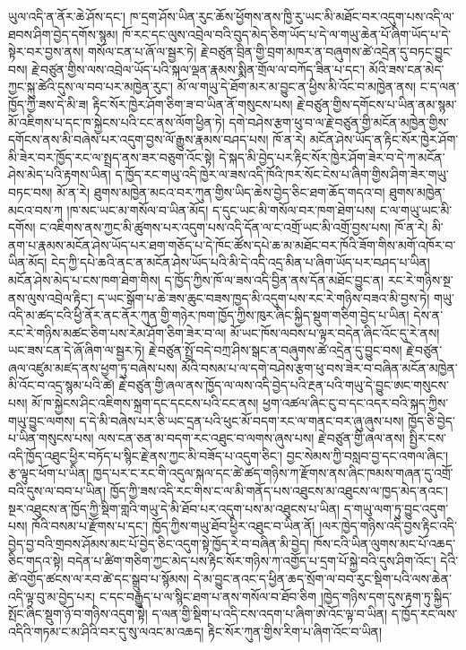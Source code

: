 \documentclass{article}
\begin{document}
ཡུལ་འདི་ན་ནོར་ཆེ་ཤོས་དང་། ཁ་དྲག་ཤོས་ཡིན་རུང་ཆོས་ཕྱོགས་ནས་ཁྱི་རུ་ཡང་མི་མཐོང་བར་འདུག་པས་འདི་ལ་ཐབས་ཤིག་བྱེད་དགོས་སྙམ། ཁོ་རང་དང་ལུས་འབྲེལ་བའི་བུད་མེད་ཅིག་ཡོད་པ་དེ་ལ་གཡུ་ཆེན་པོ་ཞིག་ཡོད་པ་དེ་སྟེར་བར་བྱས་ནས། གསོལ་ངན་པ་ཞོ་ལ་སྦྱར་ཏེ། རྗེ་བཙུན་བྲིན་གྱི་བྲག་མཁར་ན་བཞུགས་ཚེ་འདྲེན་དུ་བཏང་བྱུང་བས། རྗེ་བཙུན་གྱིས་ལས་འབྲེལ་ཡོད་པའི་སྐལ་ལྡན་རྣམས་སྨིན་གྲོལ་ལ་བཀོད་ཟིན་པ་དང་། མོའི་ཟས་ངན་མེད་ཀྱང་སྐུ་ཚེའི་དུས་ལ་བབ་པར་མཁྱེན་རུང་། མོ་ལ་གཡུ་དེ་ཐོག་མར་མ་བྱུང་ན་ཕྱིས་མི་འོང་བ་མཁྱེན་ནས། ང་ད་ལན་ཁྱོད་ཀྱི་ཟས་དེ་མི་ཟ། རྟིང་སོར་ཁྱེར་ཤོག་ཅིག་ཟ་བ་ཡིན་ནོ་གསུངས་པས། རྗེ་བཙུན་གྱིས་དགོངས་པ་ཡིན་ནམ་སྙམ་མོ་འཇིགས་པ་དང་ཁ་སྐྱེངས་པའི་ངང་ནས་ལོག་ཕྱིན་ཏེ། དགེ་བཤེས་རྩག་ཕུ་བ་ལ་རྗེ་བཙུན་གྱི་མངོན་མཁྱེན་གྱིས་དགོངས་ནས་མི་བཞེས་པར་འདུག་བྱས་ལོ་རྒྱུས་རྣམས་བཤད་པས། ཁོ་ན་རེ། མངོན་ཤེས་ཡོད་ན་རྟིང་སོར་ཁྱེར་ཤོག་མི་ཟེར་བར་ཁྱོད་རང་ལ་སྤྲད་ནས་ཟར་བཅུག་འོང་སྟེ། དེ་སྐད་མི་བྱེད་པར་རྟིང་སོར་ཁྱེར་ཤོག་ཟེར་བ་དེ་ཀ་མངོན་ཤེས་མེད་པའི་རྟགས་ཡིན། ད་ཁྱོད་རང་གཡུ་འདི་ཁྱེར་ལ་ཟས་འདི་ཁོའི་ཁར་སོང་ངེས་པ་ཞིག་གྱིས་ཤིག་ཟེར་གཡུ་བཏང་བས། མོ་ན་རེ། ཐུགས་མཁྱེན་མངའ་བར་ཀུན་གྱིས་ཡིད་ཆེས་བྱེད་ཅིང་ཐག་ཆོད་གདའ་བ། ཐུགས་མཁྱེན་མངའ་བས་ཀ །ཁ་སང་ཡང་མ་གསོལ་བ་ཡིན་མོད། ད་དུང་ཡང་མི་གསོལ་བར་ཁག་ཐེག་པས། ང་ལ་གཡུ་ཡང་མི་དགོས། ང་འཇིགས་ནས་ཀྱང་མི་ཚུགས་པར་འདུག་པས་འདི་དོན་ལ་ང་འགྲོ་ཡང་མི་འགྲོ་བྱས་པས། ཁོ་ན་རེ། མི་ནག་པ་རྣམས་མངོན་ཤེས་ཡོད་པར་ཐག་གཅོད་པ་དེ་ཁོང་ཚོས་དཔེ་ཆ་མ་མཐོང་བར་ཁོའི་ཟོག་གིས་མགོ་འཁོར་བ་ཡིན་མོད། ངེད་ཀྱི་དཔེ་ཆའི་ནང་ན་མངོན་ཤེས་ཡོད་པའི་མི་དེ་འདི་འདྲ་མིན་པ་ཞིག་ཡོད་པར་བཤད་པ་ཡིན། མངོན་ཤེས་མེད་པ་ངས་ཁག་ཐེག་གིས། ད་ཁྱོད་ཀྱིས་ཁོ་ལ་ཟས་འདི་བྱིན་ནས་དོན་མཐོང་བྱུང་ན། རང་རེ་གཉིས་སྔ་ནས་ལུས་འབྲེལ་རྟིང་། ད་ཡང་སྒོག་པ་ཆེ་ཟས་ཆུང་བཟས་ཁྱད་མི་འདུག་པས་རང་རེ་གཉིས་བཟའ་མི་བྱས་ཏེ། གཡུ་འདི་མ་ཚད་ངའི་ཕྱི་ནོར་ནང་ནོར་ཀུན་གྱི་གཉེར་ཁག་ཁྱོད་ཀྱིས་ཁུར་ཞིང་སྐྱིད་སྡུག་གཅིག་བྱེད་པ་ཡིན། དེས་ན་རང་རེ་གཉིས་མཚང་ཅིག་པས་རེམ་ཤོག་ཅིག་ཟེར་བ་ལ། མོ་ཡང་ཁོས་ལབས་པ་ལྟར་བདེན་ཞིང་འོང་དུ་རེ་ནས། ཡང་ཟས་ངན་དེ་ཞོ་ཞིག་ལ་སྦྱར་ཏེ། རྗེ་བཙུན་སྤྲོ་བདེ་བཀྲ་ཤིས་སྒང་ན་བཞུགས་ཚེ་འདྲེན་དུ་བྱུང་བས། རྗེ་བཙུན་ཞལ་འཛུམ་མཛད་ནས་ཕྱག་ཏུ་བཞེས་པས། མོའི་བསམ་པ་ལ་དགེ་བཤེས་རྩག་ཕུ་བས་ཟེར་བ་བཞིན་མངོན་མཁྱེན་མི་འོང་བ་འདྲ་སྙམ་པའི་ཚེ། རྗེ་བཙུན་གྱི་ཞལ་ནས་ཁྱོད་ལ་ལས་འདི་བྱེད་པའི་རྔན་པའི་གཡུ་དེ་བྱུང་ཨང་གསུངས་པས། མོ་ཁ་སྐྱེངས་ཤིང་འཇིགས་སྐྲག་དང་དངངས་པའི་ངང་ནས། ཕྱག་འཚལ་ཞིང་ངུ་བ་དང་འདར་བའི་སྐད་ཀྱིས་གཡུ་བྱུང་ལགས། ད་དེ་མི་བཞེས་པར་ཅི་ཡང་དྲན་པའི་ཕུང་མོ་བདག་རང་ལ་གནང་བར་ཞུ་ཞུས་པས། ཁྱོད་ཅི་བྱེད་པ་ཡིན་གསུངས་པས། ལས་ངན་ཅན་མ་བདག་རང་འཐུང་བ་ལགས་ཞུས་པས། རྗེ་བཙུན་གྱི་ཞལ་ནས། སྤྱིར་ངས་འདི་ཁྱོད་འཐུང་ཕྱིར་བཏོད་པ་སྙིང་རྗེ་ནས་ཀྱང་མི་བཟོད་པ་འདུག་ཅིང་། བྱང་སེམས་ཀྱི་བསླབ་བྱ་དང་འགལ་ཞིང་། རྩ་ལྟུང་ཕོག་པ་ཡིན། ཁྱད་པར་ང་རང་གི་འདུལ་སྐལ་དང་ཚེ་ཚད་གཉིས་ཀ་རྫོགས་ནས་ཞིང་ཁམས་གཞན་དུ་འགྲོ་བའི་དུས་ལ་བབ་པ་ཡིན། ཁྱོད་ཀྱི་ཟས་འདི་རང་གིས་ང་ལ་མི་གནོད་པས་འཐུངས་མ་འཐུངས་ལ་ཁྱད་མེད་ནའང་། སྔར་འཐུངས་ན་ཁྱོད་ཀྱི་སྡིག་གླའི་གཡུ་དེ་མི་ཐོབ་པར་འདུག་པས་མ་འཐུངས་པ་ཡིན། ད་གཡུ་ལག་ཏུ་བྱུང་འདུག་པས། ཁོའི་བསམ་པ་རྫོགས་པ་དང་། ཁྱོད་ཀྱིས་གཡུ་ཐོབ་ཕྱིར་འཐུང་བ་ཡིན་ནོ། །ལར་ཁྱེད་གཉིས་འདི་བྱས་རྟིང་འདི་བྱེད་བྱ་བའི་གྲབས་ཤོམས་མང་པོ་བྱེད་ཅིང་འདུག་སྟེ་ཁྱོད་རེ་བ་བཞིན་མི་བྱེད། ཁོས་ངའི་ཡིན་ལུགས་མང་པོ་འཆད་ཅིང་གདའ་སྟེ། བདེན་པ་ཚིག་གཅིག་ཀྱང་མེད་པས་རྟིང་སོར་གཉིས་ཀ་འགྱོད་པ་དྲག་པོ་སྐྱེ་བའི་དུས་ཤིག་འོང་། དེའི་ཚེ་འགྱོད་ཚངས་ལ་རབ་ཚེ་དང་སྒྲུབ་པ་སྙོམས། དེ་མ་བྱུང་ནའང་ད་ཕྱིན་ཆད་སྲོག་ལ་བབ་རུང་སྡིག་པའི་ལས་ཆེན་འདི་ལྟ་བུ་མ་བྱེད་པར། ང་དང་བརྒྱུད་པ་ལ་སྙིང་ཐག་པ་ནས་གསོལ་བ་ཐོབ་ཅིག །ཁྱེད་གཉིས་དག་དུས་རྟག་ཏུ་སྐྱིད་སྤོང་ཞིང་སྡུག་ཉོ་བ་གཉིས་འདུག་སྟེ། ད་ལན་གྱི་སྡིག་པ་འདི་ངས་འདག་པ་ཞིག་ཨེ་འོང་ལྟ་བ་ཡིན། ད་ཁྱོད་རང་ལས་འདིའི་གཏམ་ང་མ་ཤིའི་བར་དུ་སུ་ལའང་མ་འཆད། རྟིང་སོར་ཀུན་གྱིས་རིག་པ་ཞིག་འོང་བ་ཡིན། 
\end{document}
